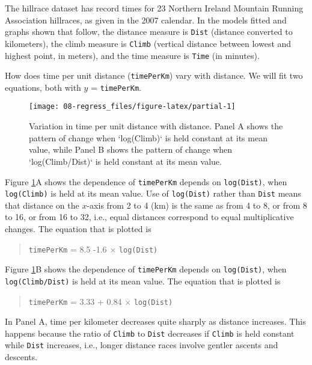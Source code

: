\documentclass[
  10ptls,
  b5paper]{book}
\begin{document}
The hillrace dataset has record times for 23 Northern Ireland Mountain Running Association hillraces, as given in the 2007 calendar. In the models fitted and graphs shown that follow, the distance measure is \texttt{Dist} (distance converted to kilometers), the climb measure is \texttt{Climb} (vertical distance between lowest and highest point, in meters), and the time measure is \texttt{Time} (in minutes).

How does time per unit distance (\texttt{timePerKm}) vary with distance. We will fit two equations, both with \(y\) = \texttt{timePerKm}.

\begin{figure}[H]

{\centering \texttt{[image: 08-regress\_files/figure-latex/partial-1]} 

}

\caption{Variation in time per unit distance with distance.  Panel A
shows the pattern of change when `log(Climb)` is held constant at its 
mean value, while Panel B shows the pattern of change when 
`log(Climb/Dist)` is held constant at its mean value.}\label{fig:partial}
\end{figure}

Figure \ref{fig:partial}A shows the dependence of \texttt{timePerKm} depends on \texttt{log(Dist)}, when \texttt{log(Climb)} is held at its mean value. Use of \texttt{log(Dist)} rather than \texttt{Dist} means that distance on the \(x\)-axis from 2 to 4 (km) is the same as from 4 to 8, or from 8 to 16, or from 16 to 32, i.e., equal distances correspond to equal multiplicative changes. The equation that is plotted is

\begin{quote}
\texttt{timePerKm} = 8.5 -1.6 \(\times\) \texttt{log(Dist)}
\end{quote}

Figure \ref{fig:partial}B shows the dependence of \texttt{timePerKm} depends on \texttt{log(Dist)}, when \texttt{log(Climb/Dist)} is held at its mean value. The equation that is plotted is

\begin{quote}
\texttt{timePerKm} = 3.33 + 0.84 \(\times\) \texttt{log(Dist)}
\end{quote}

In Panel A, time per kilometer decreases quite sharply as distance increases. This happens because the ratio of \texttt{Climb} to \texttt{Dist} decreases if \texttt{Climb} is held constant while \texttt{Dist} increases, i.e., longer distance races involve gentler ascents and descents.
\end{document}
